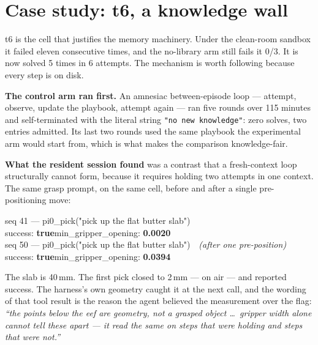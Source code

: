\documentclass[11pt,a4paper]{article}
\begin{document}
\section{Case study: t6, a knowledge wall}

t6 is the cell that justifies the memory machinery. Under the clean-room
sandbox it failed eleven consecutive times, and the no-library arm still fails
it 0/3. It is now solved 5 times in 6 attempts. The mechanism is worth following
because every step is on disk.

\textbf{The control arm ran first.} An amnesiac between-episode loop --- attempt,
observe, update the playbook, attempt again --- ran five rounds over 115
minutes and self-terminated with the literal string \texttt{"no new knowledge"}:
zero solves, two entries admitted. Its last two rounds used the same playbook
the experimental arm would start from, which is what makes the comparison
knowledge-fair.

\textbf{What the resident session found} was a contrast that a fresh-context
loop structurally cannot form, because it requires holding two attempts in one
context. The same grasp prompt, on the same cell, before and after a single
pre-positioning move:

\begin{evidence}[title={The discriminator, from \texttt{attempt\_01/tool\_calls.jsonl}}]
\ttfamily\footnotesize
seq 41 --- pi0\_pick("pick up the flat butter slab")\\
\hspace*{2em}success: \textbf{true}\quad min\_gripper\_opening: \textbf{0.0020}\\[0.4em]
seq 50 --- pi0\_pick("pick up the flat butter slab")\ \ \textrm{\emph{(after one pre-position)}}\\
\hspace*{2em}success: \textbf{true}\quad min\_gripper\_opening: \textbf{0.0394}
\end{evidence}

\noindent
The slab is 40\,mm. The first pick closed to 2\,mm --- on air --- and reported
success. The harness's own geometry caught it at the next call, and the wording
of that tool result is the reason the agent believed the measurement over the
flag: \emph{``the points below the eef are geometry, not a grasped object
\ldots\ gripper width alone cannot tell these apart --- it read the same on
steps that were holding and steps that were not.''}
\end{document}
